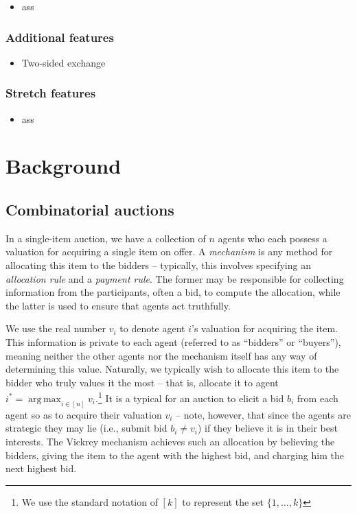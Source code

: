 \documentclass[10pt,a4paper]{article}
\theoremstyle{plain}
\theoremstyle{definition}
\DeclareMathOperator*{\argmax}{arg\,max}
\begin{document}
	\begin{itemize}
		\item ass
	\end{itemize}

	\subsubsection{Additional features}

	\begin{itemize}
		\item Two-sided exchange 
	\end{itemize}

	\subsubsection{Stretch features}

	\begin{itemize}
		\item ass
	\end{itemize}

\section{Background}
	\label{sec:background}

	\subsection{Combinatorial auctions}

	In a single-item auction, we have a collection of $n$ agents who each
	possess a valuation for acquiring a single item on offer. A
	\emph{mechanism} is any method for allocating this item to the bidders --
	typically, this involves specifying an \emph{allocation rule} and a
	\emph{payment rule}. The former may be responsible for collecting
	information from the participants, often a bid, to compute the allocation,
	while the latter is used to ensure that agents act truthfully.

	We use the real number $v_i$ to denote agent $i$'s valuation for acquiring
	the item. This information is private to each agent (referred to as
	``bidders'' or ``buyers''), meaning neither the other agents nor the
	mechanism itself has any way of determining this value. Naturally, we
	typically wish to allocate this item to the bidder who truly values it the
	most -- that is, allocate it to agent $i^* = \argmax_{i \in [n]}
	v_i$.\footnote{We use the standard notation of $[k]$ to represent the set
	$\{ 1, \ldots, k \}$} It is a typical for an auction to elicit a bid $b_i$
	from each agent so as to acquire their valuation $v_i$ -- note, however,
	that since the agents are strategic they may lie (i.e., submit bid $b_i
	\neq v_i$) if they believe it is in their best interests.  The Vickrey
	mechanism \cite{Vickrey1961} achieves such an allocation by believing the
	bidders, giving the item to the agent with the highest bid, and charging
	him the next highest bid.
\end{document}

